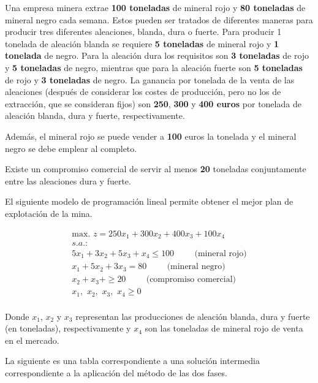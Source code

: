 Una empresa minera extrae \textbf{100 toneladas} de mineral rojo y \textbf{80 toneladas} de mineral negro cada semana. Estos pueden ser tratados de diferentes maneras para producir tres diferentes aleaciones, blanda, dura o fuerte. Para producir 1 tonelada de aleación blanda se requiere \textbf{5 toneladas} de mineral rojo y \textbf{1 tonelada} de negro. Para la aleación dura los requisitos son \textbf{3 toneladas} de rojo y \textbf{5 toneladas} de negro, mientras que para la aleación fuerte son \textbf{5 toneladas} de rojo y \textbf{3 toneladas} de negro. La ganancia por tonelada de la venta de las aleaciones (después de considerar los costes de producción, pero no los de extracción, que se consideran fijos) son \textbf{250}, \textbf{300} y \textbf{400 euros} por tonelada de aleación blanda, dura y fuerte, respectivamente.

Además, el mineral rojo se puede vender a \textbf{100} euros la tonelada y el mineral negro se debe emplear al completo.

Existe un compromiso comercial de servir al menos \textbf{20} toneladas conjuntamente entre las aleaciones dura y fuerte.

El siguiente modelo de programación lineal permite obtener el mejor plan de explotación de la mina.

\begin{equation}
\begin{split}
\mbox{max. } z = 250x_1 + 300x_2 + 400x_3 + 100x_4\\
s.a.:\\
5x_1 + 3x_2 + 5x_3 + x_4 \leq 100 \hspace{1cm} \mbox{(mineral rojo)} \\
 x_1 + 5x_2 + 3x_3   = 80\hspace{1cm} \mbox{(mineral negro)} \\
        x_2 +  x_3 +  \geq 20 \hspace{1cm} \mbox{(compromiso comercial)} \\
x_1,\,\,x_2,\,\,x_3,\,\,x_4\geq 0\\
\end{split}
\end{equation}

Donde $x_1$, $x_2$ y $x_3$ representan las producciones de aleación blanda, dura y fuerte (en toneladas), respectivamente y $x_4$ son las toneladas de mineral rojo de venta en el mercado.

La siguiente es una tabla correspondiente a una solución intermedia correspondiente a la aplicación del método de las dos fases.

